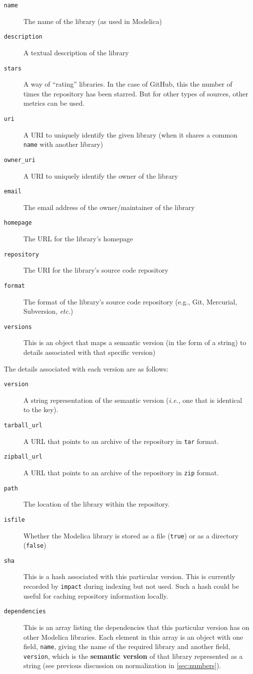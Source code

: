 \documentclass[11pt,a4paper,twocolumn]{article}
\newcommand{\code}[1]{\texttt{#1}} %
\begin{document}
\begin{description}
  \item[\code{name}] The name of the library (as used in Modelica)
  \item[\code{description}] A textual description of the library
  \item[\code{stars}] A way of ``rating'' libraries.  In the case of
    GitHub, this the number of times the repository has been starred.
    But for other types of sources, other metrics can be used.
  \item[\code{uri}] A URI to uniquely identify the given library (when
    it shares a common \code{name} with another library)
  \item[\code{owner\_uri}] A URI to uniquely identify the owner of the
    library
  \item[\code{email}] The email address of the owner/maintainer of the
    library
  \item[\code{homepage}] The URL for the library's homepage
  \item[\code{repository}] The URI for the library's source code
    repository
  \item[\code{format}] The format of the library's source code
    repository (e.g., Git, Mercurial, Subversion, \emph{etc.})
  \item[\code{versions}] This is an object that maps a semantic
    version (in the form of a string) to details associated with that
    specific version)
\end{description}

The details associated with each version are as follows:

\begin{description}
  \item[\code{version}] A string representation of the semantic
    version (\emph{i.e.,} one that is identical to the key).
  \item[\code{tarball\_url}] A URL that points to an archive of the
    repository in \code{tar} format.
  \item[\code{zipball\_url}] A URL that points to an archive of the
    repository in \code{zip} format.
  \item[\code{path}] The location of the library within the
    repository.
  \item[\code{isfile}] Whether the Modelica library is stored as a
    file (\code{true}) or as a directory (\code{false})
  \item[\code{sha}] This is a hash associated with this particular
    version.  This is currently recorded by \code{impact} during
    indexing but not used.  Such a hash could be useful for caching
    repository information locally.
  \item[\code{dependencies}] This is an array listing the dependencies
    that this particular version has on other Modelica libraries.
    Each element in this array is an object with one field,
    \code{name}, giving the name of the required library and another
    field, \code{version}, which is the \textbf{semantic version} of that
    library represented as a string (see previous discussion on
    normalization in \ref{sec:numbers}).
\end{description}
\end{document}
